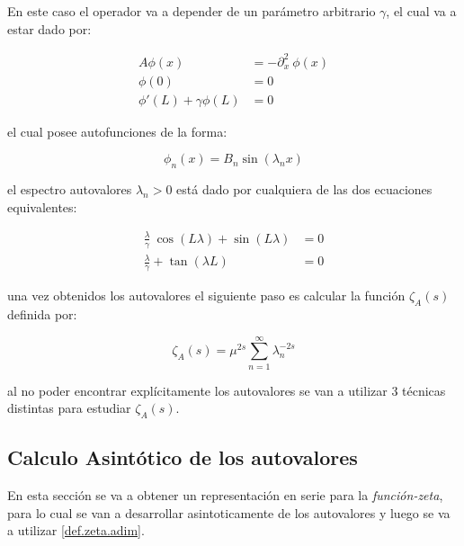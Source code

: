 En este caso el operador va a depender de un parámetro arbitrario $\gamma$, el cual va a estar dado por:

\begin{equation}
\begin{aligned}
    A \phi (x) &= - \partial ^2 _x \ \phi (x)  \\[5pt]
    \phi (0) &= 0 \\[5pt]
    \phi ' (L) + \gamma \phi (L) &= 0
\end{aligned}
\end{equation}

el cual posee autofunciones de la forma:

\begin{equation}
\phi _n (x) = 
B _n \sin ( \lambda _n x )
\end{equation}

el espectro autovalores $\lambda _n > 0 $ está dado por  cualquiera de las dos ecuaciones equivalentes: 

\begin{equation}
\begin{aligned}
    \frac{\lambda}{\gamma}  \ \cos( L \lambda ) +   \sin( L \lambda ) &= 0 \\[5pt]
    \frac{\lambda}{\gamma}  + \tan (\lambda L )  &= 0 
\label{autovalores}
\end{aligned}
\end{equation}



una vez obtenidos los autovalores el siguiente paso es calcular la función $\zeta _A (s) $ definida por:

\begin{equation}
    \zeta _ {A } (s) = \mu ^{2s} \sum_{n = 1} ^{ \infty } \lambda _n ^ {-2 s}
\end{equation}

al no poder encontrar explícitamente los autovalores se van a utilizar 3 técnicas distintas para estudiar $\zeta _A (s)$.

\subsection{Calculo Asintótico de los autovalores}

En esta sección se va a obtener un representación en serie para la {\it función-zeta}, para lo cual se van a desarrollar asintoticamente de los autovalores y luego se va a utilizar \ref{def.zeta.adim}.\\


